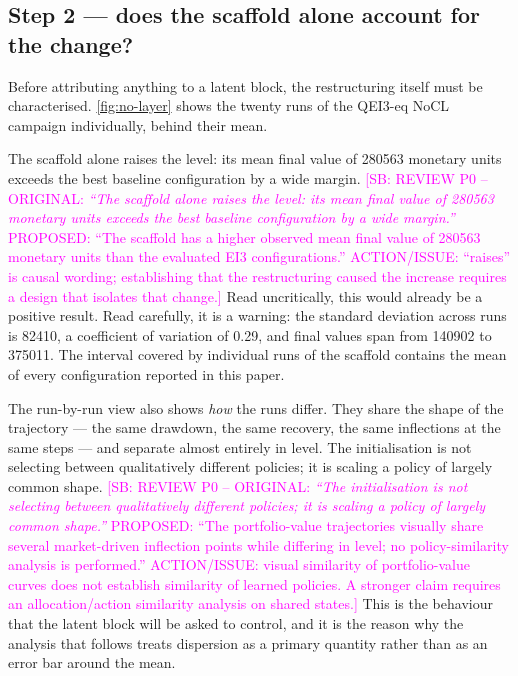 \documentclass[aps,floatfix,superscriptaddress,twocolumn,tightenlines,amsmath,amssymb,nofootinbib,10pt,longbibliography,prl]{revtex4-2}
\newcommand{\sam}[1]{\textcolor{magenta}{[SB: {#1}]}}
\begin{document}
\subsection{Step 2 --- does the scaffold alone account for the change?}
\label{subsec:res-scaffold}

Before attributing anything to a latent block, the restructuring itself must be characterised. \ref{fig:no-layer} shows the twenty runs of the QEI3-eq NoCL campaign individually, behind their mean.

The scaffold alone raises the level: its mean final value of \num{280563} monetary units exceeds the best baseline configuration by a wide margin.
\sam{REVIEW P0 -- ORIGINAL: \textit{``The scaffold alone raises the level: its mean final value of \num{280563} monetary units exceeds the best baseline configuration by a wide margin.''} PROPOSED: ``The scaffold has a higher observed mean final value of \num{280563} monetary units than the evaluated EI3 configurations.'' ACTION/ISSUE: ``raises'' is causal wording; establishing that the restructuring caused the increase requires a design that isolates that change.} Read uncritically, this would already be a positive result. Read carefully, it is a warning: the standard deviation across runs is \num{82410}, a coefficient of variation of \num{0.29}, and final values span from \num{140902} to \num{375011}. The interval covered by individual runs of the scaffold contains the mean of every configuration reported in this paper.

The run-by-run view also shows \emph{how} the runs differ. They share the shape of the trajectory --- the same drawdown, the same recovery, the same inflections at the same steps --- and separate almost entirely in level. The initialisation is not selecting between qualitatively different policies; it is scaling a policy of largely common shape.
\sam{REVIEW P0 -- ORIGINAL: \textit{``The initialisation is not selecting between qualitatively different policies; it is scaling a policy of largely common shape.''} PROPOSED: ``The portfolio-value trajectories visually share several market-driven inflection points while differing in level; no policy-similarity analysis is performed.'' ACTION/ISSUE: visual similarity of portfolio-value curves does not establish similarity of learned policies. A stronger claim requires an allocation/action similarity analysis on shared states.} This is the behaviour that the latent block will be asked to control, and it is the reason why the analysis that follows treats dispersion as a primary quantity rather than as an error bar around the mean.
\end{document}
